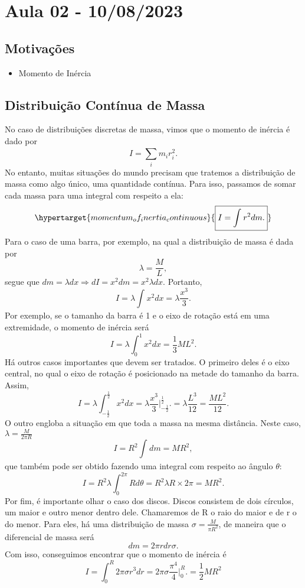 \documentclass[physicsII_notes.tex]{subfiles}
\begin{document}
\section{Aula 02 - 10/08/2023}
\subsection{Motivações}
\begin{itemize}
	\item Momento de Inércia
\end{itemize}
\subsection{Distribuição Contínua de Massa}
No caso de distribuições discretas de massa, vimos que o momento de inércia é dado por
\[
	I=\sum\limits_{i}^{}m_{i}r_{i}^{2}.
\]
No entanto, muitas situações do mundo precisam que tratemos a distribuição de massa como algo único, uma
quantidade contínua. Para isso, passamos de somar cada massa para uma integral com respeito a ela:
\[
	\hypertarget{momentum_of_inertia_continuous}{\boxed{I = \int_{}^{}r^{2}dm.}}
\]
Para o caso de uma barra, por exemplo, na qual a distribuição de massa é dada por
\[
	\lambda = \frac{M}{L},
\]
segue que \(dm = \lambda dx \Rightarrow dI = x^{2}dm = x^{2}\lambda dx\). Portanto,
\[
	I = \lambda \int_{}^{}x^{2}dx = \lambda \frac{x^{3}}{3}.
\]
Por exemplo, se o tamanho da barra é 1 e o eixo de rotação está em uma extremidade, o momento de inércia será
\[
	I = \lambda \int_{0}^{1}x^{2}dx =\frac{1}{3}ML^{2}.
\]
Há outros casos importantes que devem ser tratados. O primeiro deles é o eixo central,
no qual o eixo de rotação é posicionado na metade do tamanho da barra. Assim,
\[
	I = \lambda \int_{-\frac{1}{2}}^{\frac{1}{2}}x^{2}dx = \lambda \frac{x^{3}}{3}\biggl|_{-\frac{1}{2}}^{\frac{1}{2}}\biggr. = \lambda \frac{L^{3}}{12} = \frac{ML^{2}}{12}.
\]
O outro engloba a situação em que toda a massa na mesma distância. Neste caso, \(\lambda = \frac{M}{2\pi R}\)
\[
	I = R^{2} \int_{}^{}dm = MR^{2},
\]
que também pode ser obtido fazendo uma integral com respeito ao ângulo \(\theta \):
\[
	I = R^{2}\lambda \int_{0}^{2\pi } R d\theta = R^{2}\lambda R\times2\pi = MR^{2}.
\]
Por fim, é importante olhar o caso dos discos. Discos consistem de dois círculos, um maior e outro menor dentro dele.
Chamaremos de R o raio do maior e de r o do menor. Para eles, há uma distribuição de massa
\(\sigma = \frac{M}{\pi R^{2}}\), de maneira que o diferencial de massa será
\[
	dm = 2\pi r dr\sigma.
\]
Com isso, conseguimos encontrar que o momento de inércia é
\[
	I = \int_{0}^{R}2\pi \sigma r^{3}dr = 2\pi \sigma \frac{\pi^{4}}{4}\biggl|_{0}^{R}\biggr. = \frac{1}{2}MR^{2}
\]
\end{document}
